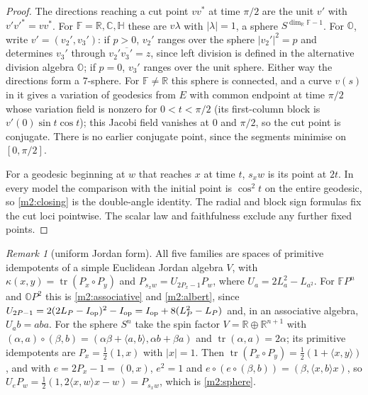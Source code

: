 \documentclass[11pt,reqno]{amsart}
\theoremstyle{definition}
\theoremstyle{remark}
\newtheorem{remark}[theorem]{Remark}
\numberwithin{equation}{section}
\newcommand{\R}{\mathbb{R}}
\newcommand{\C}{\mathbb{C}}
\newcommand{\HH}{\mathbb{H}}
\newcommand{\ip}[2]{\langle #1,#2\rangle}
\begin{document}
\begin{proof}
The directions reaching a cut point $vv^*$ at time $\pi/2$ are the unit $v'$ with $v'v'^*=vv^*$.  For $\mathbb F=\R,\C,\HH$ these are
$v\lambda$ with $|\lambda|=1$, a sphere $S^{\dim_\R\mathbb F-1}$.  For $\mathbb O$, write $v'=(v_2',v_3')$: if $p>0$, $v_2'$ ranges over
the sphere $|v_2'|^2=p$ and determines $v_3'$ through $v_2'\overline{v_3'}=z$, since left division is defined in the alternative division
algebra $\mathbb O$; if $p=0$, $v_3'$ ranges over the unit sphere.  Either way the directions form a $7$-sphere.  For
$\mathbb F\ne\R$ this sphere is connected, and a curve $v(s)$ in it gives a variation of geodesics from $E$ with common endpoint at time
$\pi/2$ whose variation field is nonzero for $0<t<\pi/2$ (its first-column block is $v'(0)\sin t\cos t$); this Jacobi field vanishes at
$0$ and $\pi/2$, so the cut point is conjugate.  There is no earlier conjugate point, since the segments minimise on $[0,\pi/2]$.

For a geodesic beginning at $w$ that reaches $x$ at time $t$, $s_xw$ is its point at $2t$.  In every model the comparison with the initial
point is $\cos^2t$ on the entire geodesic, so \eqref{m2:closing} is the double-angle identity.  The radial and block sign formulas fix the
cut loci pointwise.  The scalar law and faithfulness exclude any further fixed points.
\end{proof}

\begin{remark}[uniform Jordan form]\label{m2:jordan}
All five families are spaces of primitive idempotents of a simple Euclidean Jordan algebra $V$, with $\kappa(x,y)=\operatorname{tr}(P_x\circ P_y)$
and $P_{s_xw}=U_{2P_x-1}P_w$, where $U_a=2L_a^2-L_{a^2}$.  For $\mathbb FP^n$ and $\mathbb OP^2$ this is \eqref{m2:associative} and
\eqref{m2:albert}, since $U_{2P-1}=2(2L_P-I_{\rm op})^2-I_{\rm op}=I_{\rm op}+8(L_P^2-L_P)$ and, in an associative algebra,
$U_ab=aba$.  For the sphere $S^n$ take the spin factor $V=\R\oplus\R^{n+1}$ with $(\alpha,a)\circ(\beta,b)=(\alpha\beta+\ip ab,\alpha b+\beta a)$
and $\operatorname{tr}(\alpha,a)=2\alpha$; its primitive idempotents are $P_x=\tfrac12(1,x)$ with $|x|=1$.  Then
$\operatorname{tr}(P_x\circ P_y)=\tfrac12(1+\ip xy)$, and with $e=2P_x-1=(0,x)$, $e^2=1$ and $e\circ(e\circ(\beta,b))=(\beta,\ip xbx)$, so
$U_eP_w=\tfrac12(1,2\ip xwx-w)=P_{s_xw}$, which is \eqref{m2:sphere}.
\end{remark}
\end{document}
